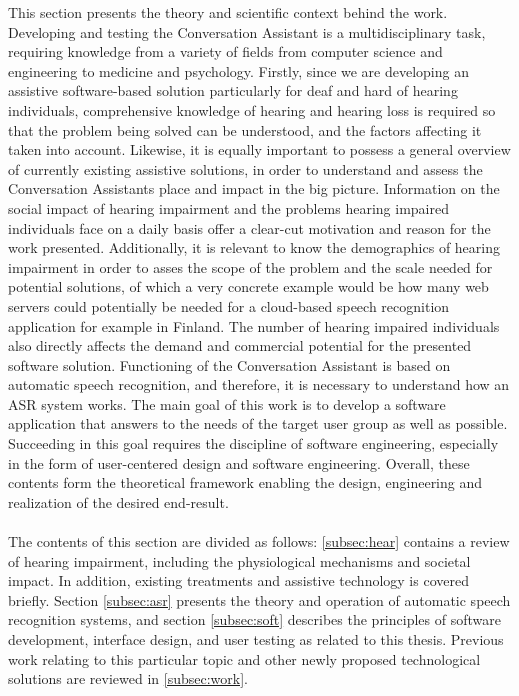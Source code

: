\documentclass[english, 12pt, a4paper, pdftex, elec, utf8]{aaltothesis}
\begin{document}
This section presents the theory and scientific context behind the work. Developing and testing the Conversation Assistant is a multidisciplinary task, requiring knowledge from a variety of fields from computer science and engineering to medicine and psychology. Firstly, since we are developing an assistive software-based solution particularly for deaf and hard of hearing individuals, comprehensive knowledge of hearing and hearing loss is required so that the problem being solved can be understood, and the factors affecting it taken into account. Likewise, it is equally important to possess a general overview of currently existing assistive solutions, in order to understand and assess the Conversation Assistants place and impact in the big picture. Information on the social impact of hearing impairment and the problems hearing impaired individuals face on a daily basis offer a clear-cut motivation and reason for the work presented. Additionally, it is relevant to know the demographics of hearing impairment in order to asses the scope of the problem and the scale needed for potential solutions, of which a very concrete example would be how many web servers could potentially be needed for a cloud-based speech recognition application for example in Finland. The number of hearing impaired individuals also directly affects the demand and commercial potential for the presented software solution. Functioning of the Conversation Assistant is based on automatic speech recognition, and therefore, it is necessary to understand how an ASR system works. The main goal of this work is to develop a software application that answers to the needs of the target user group as well as possible. Succeeding in this goal requires the discipline of software engineering, especially in the form of user-centered design and software engineering. Overall, these contents form the theoretical framework enabling the design, engineering and realization of the desired end-result. \\\\
The contents of this section are divided as follows: \ref{subsec:hear} contains a review of hearing impairment, including the physiological mechanisms and societal impact. In addition, existing treatments and assistive technology is covered briefly. Section \ref{subsec:asr} presents the theory and operation of automatic speech recognition systems, and section \ref{subsec:soft} describes the principles of software development, interface design, and user testing as related to this thesis. Previous work relating to this particular topic and other newly proposed technological solutions are reviewed in \ref{subsec:work}.
\end{document}
